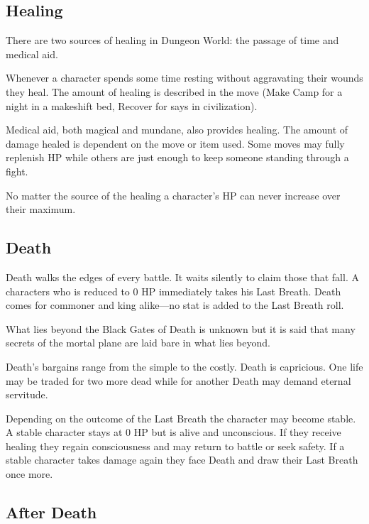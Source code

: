  
\subsection{Healing}  
 

There are two sources of healing in Dungeon World: the passage of time and medical aid.

 

Whenever a character spends some time resting without aggravating their wounds they heal. The amount of healing is described in the move (Make Camp for a night in a makeshift bed, Recover for says in civilization).

 

Medical aid, both magical and mundane, also provides healing. The amount of damage healed is dependent on the move or item used. Some moves may fully replenish HP while others are just enough to keep someone standing through a fight.

 

No matter the source of the healing a character's HP can never increase over their maximum.

 
\subsection{Death}   
 

Death walks the edges of every battle. It waits silently to claim those that fall. A characters who is reduced to 0 HP immediately takes his Last Breath. Death comes for commoner and king alike—no stat is added to the Last Breath roll.

 

What lies beyond the Black Gates of Death is unknown but it is said that many secrets of the mortal plane are laid bare in what lies beyond.

 

Death's bargains range from the simple to the costly. Death is capricious. One life may be traded for two more dead while for another Death may demand eternal servitude.

 

Depending on the outcome of the Last Breath the character may become stable. A stable character stays at 0 HP but is alive and unconscious. If they receive healing they regain consciousness and may return to battle or seek safety. If a stable character takes damage again they face Death and draw their Last Breath once more.

 
\subsection{After Death}   
 

